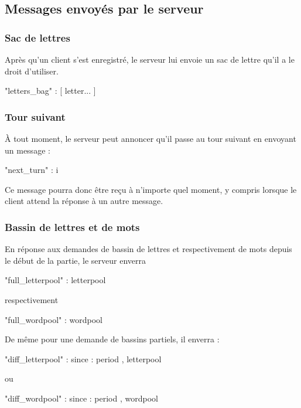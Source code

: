 \documentclass{article}
\begin{document}
\subsection{Messages envoyés par le serveur}
\label{sec:messages-envoyes}

\subsubsection{Sac de lettres}
\label{sec:sac-de-lettres}
Après qu'un client s'est enregistré, le serveur lui envoie un sac de
lettre qu'il a le droit d'utiliser.
\begin{jsonMessage}
  { "letters_bag" : [ letter... ] }
\end{jsonMessage}

\subsubsection{Tour suivant}
\label{sec:tour-suivant}
À tout moment, le serveur peut annoncer qu'il passe au tour suivant en
envoyant un message :
\begin{jsonMessage}
  { "next_turn" : i }
\end{jsonMessage}

Ce message pourra donc être reçu à n'importe quel moment, y compris
lorsque le client attend la réponse à un autre message.


\subsubsection{Bassin de lettres et de mots}
\label{sec:bassin-de-lettres}
En réponse aux demandes de bassin de lettres et respectivement de mots
depuis le début de la partie, le serveur enverra
\begin{jsonMessage}
  { "full_letterpool" : letterpool }
\end{jsonMessage}
respectivement
\begin{jsonMessage}
  { "full_wordpool" : wordpool }
\end{jsonMessage}
De même pour une demande de bassins partiels, il enverra :

 \begin{jsonMessage}
   { "diff_letterpool" : {since : period , letterpool } }
 \end{jsonMessage}
 ou
 \begin{jsonMessage}
   { "diff_wordpool" : {since : period , wordpool } }
 \end{jsonMessage}
\end{document}
